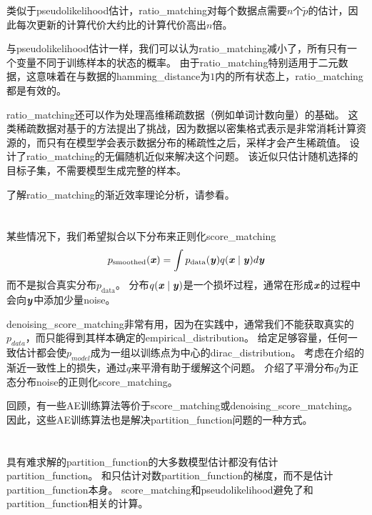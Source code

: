 
类似于\gls{pseudolikelihood}估计，\gls{ratio_matching}对每个数据点需要$n$个$\tilde{p}$的估计，因此每次更新的计算代价大约比的计算代价高出$n$倍。


与\gls{pseudolikelihood}估计一样，我们可以认为\gls{ratio_matching}减小了，所有只有一个变量不同于训练样本的状态的概率。
由于\gls{ratio_matching}特别适用于二元数据，这意味着在与数据的\gls{hamming_distance}为$1$内的所有状态上，\gls{ratio_matching}都是有效的。


\gls{ratio_matching}还可以作为处理高维稀疏数据（例如单词计数向量）的基础。
这类稀疏数据对基于的方法提出了挑战，因为数据以密集格式表示是非常消耗计算资源的，而只有在模型学会表示数据分布的稀疏性之后，采样才会产生稀疏值。
\cite{Dauphin+Bengio-NIPS2013}设计了\gls{ratio_matching}的无偏随机近似来解决这个问题。
该近似只估计随机选择的目标子集，不需要模型生成完整的样本。


了解\gls{ratio_matching}的渐近效率理论分析，请参看\cite{Marlin11-small}。


\section{}
\label{sec:denoising_score_matching}
某些情况下，我们希望拟合以下分布来正则化\gls{score_matching}
\begin{equation}
	p_{\text{smoothed}}(\boldsymbol{\mathit{x}}) = \int p_{\text{data}} (\boldsymbol{\mathit{y}}) q( \boldsymbol{\mathit{x}} \mid \boldsymbol{\mathit{y}}) d \boldsymbol{\mathit{y}}
\end{equation}
而不是拟合真实分布$p_{\text{data}}$。
分布$q(\boldsymbol{\mathit{x}} \mid \boldsymbol{\mathit{y}})$是一个损坏过程，通常在形成$\boldsymbol{\mathit{x}}$的过程中会向$\boldsymbol{\mathit{y}}$中添加少量\gls{noise}。


\gls{denoising_score_matching}非常有用，因为在实践中，通常我们不能获取真实的$p_{data}$，而只能得到其样本确定的\gls{empirical_distribution}。
给定足够容量，任何一致估计都会使$p_{model}$成为一组以训练点为中心的\gls{dirac_distribution}。
考虑在介绍的渐近一致性上的损失，通过$q$来平滑有助于缓解这个问题。
\cite{Kingma+LeCun-2010}介绍了平滑分布$q$为正态分布\gls{noise}的正则化\gls{score_matching}。


回顾，有一些\gls{AE}训练算法等价于\gls{score_matching}或\gls{denoising_score_matching}。
因此，这些\gls{AE}训练算法也是解决\gls{partition_function}问题的一种方式。


\section{}
\label{sec:noise_contrastive_estimation}
具有难求解的\gls{partition_function}的大多数模型估计都没有估计\gls{partition_function}。
和只估计对数\gls{partition_function}的梯度，而不是估计\gls{partition_function}本身。
\gls{score_matching}和\gls{pseudolikelihood}避免了和\gls{partition_function}相关的计算。 


